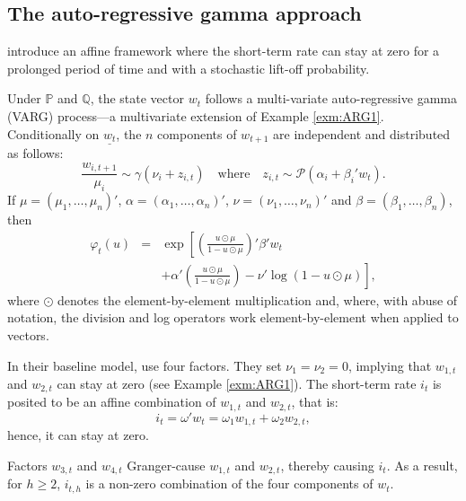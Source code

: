 \documentclass[
  12pt,
]{book}
\theoremstyle{definition}
\theoremstyle{definition}
\theoremstyle{definition}
\theoremstyle{definition}
\theoremstyle{remark}
\begin{document}
\hypertarget{the-auto-regressive-gamma-approach}{%
\subsection{The auto-regressive gamma approach}\label{the-auto-regressive-gamma-approach}}

\citet{zarg_2017} introduce an affine framework where the short-term rate can stay at zero for a prolonged period of time and with a stochastic lift-off probability.

Under \(\mathbb{P}\) and \(\mathbb{Q}\), the state vector \(w_t\) follows a multi-variate auto-regressive gamma (VARG) process---a multivariate extension of Example \ref{exm:ARG1}. Conditionally on \(\underline{w_t}\), the \(n\) components of \(w_{t+1}\) are independent and distributed as follows:
\begin{equation}
\frac{w_{i,t+1}}{\mu_i} \sim \gamma(\nu_i+z_{i,t}) \quad \mbox{where} \quad z_{i,t} \sim {\mathcal P} \left( \alpha_i + \beta_i' w_t \right).\label{eq:VARG}
\end{equation}
If \(\mu = (\mu_1,\dots,\mu_n)'\), \(\alpha = (\alpha_1,\dots,\alpha_n)'\), \(\nu = (\nu_1,\dots,\nu_n)'\) and \(\beta = (\beta_1,\dots,\beta_n)\), then
\begin{eqnarray*}
\varphi_t(u) &=& \exp\left[\left(\frac{u \odot \mu}{1 - u \odot \mu}\right)'\beta' w_t \right.\\
&& \left. + \alpha'\left(\frac{u \odot \mu}{1 - u \odot \mu}\right) - \nu'\log(1 - u \odot \mu)\right],
\end{eqnarray*}
where \(\odot\) denotes the element-by-element multiplication and, where, with abuse of notation, the division and log operators work element-by-element when applied to vectors.

In their baseline model, \citet{zarg_2017} use four factors. They set \(\nu_1 = \nu_2 = 0\), implying that \(w_{1,t}\) and \(w_{2,t}\) can stay at zero (see Example \ref{exm:ARG1}). The short-term rate \(i_t\) is posited to be an affine combination of \(w_{1,t}\) and \(w_{2,t}\), that is:
\[
i_t = \omega'w_t = \omega_{1} w_{1,t} + \omega_{2} w_{2,t},
\]
hence, it can stay at zero.

Factors \(w_{3,t}\) and \(w_{4,t}\) Granger-cause \(w_{1,t}\) and \(w_{2,t}\), thereby causing \(i_t\). As a result, for \(h \ge 2\), \(i_{t,h}\) is a non-zero combination of the four components of \(w_t\).
\end{document}
